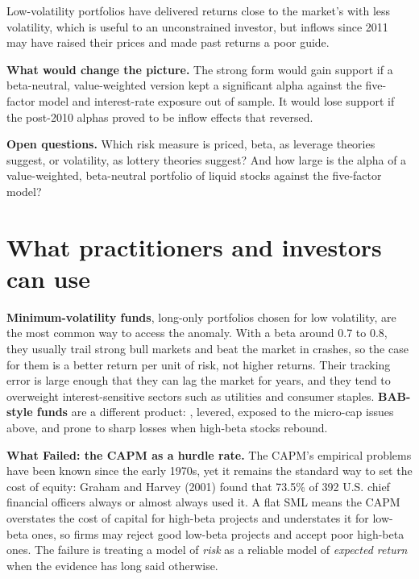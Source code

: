 Low-volatility portfolios have delivered returns close to the market's with less volatility, which is useful to an unconstrained investor, but inflows since 2011 may have raised their prices and made past returns a poor guide.

\textbf{What would change the picture.} The strong form would gain support if a beta-neutral, value-weighted version kept a significant alpha against the five-factor model and interest-rate exposure out of sample. It would lose support if the post-2010 alphas proved to be inflow effects that reversed.

\label{sec:18-open}
\textbf{Open questions.} Which risk measure is priced, beta, as leverage theories suggest, or volatility, as lottery theories suggest? And how large is the alpha of a value-weighted, beta-neutral portfolio of liquid stocks against the five-factor model?

\section{What practitioners and investors can use}
\label{sec:18-investors}

\textbf{Minimum-volatility funds}, long-only portfolios chosen for low volatility, are the most common way to access the anomaly. With a beta around 0.7 to 0.8, they usually trail strong bull markets and beat the market in crashes, so the case for them is a better return per unit of risk, not higher returns. Their tracking error is large enough that they can lag the market for years, and they tend to overweight interest-sensitive sectors such as utilities and consumer staples. \textbf{BAB-style funds} are a different product: , levered, exposed to the micro-cap issues above, and prone to sharp losses when high-beta stocks rebound.

\begin{callout}
\textbf{What Failed: the CAPM as a hurdle rate.} The CAPM's empirical problems have been known since the early 1970s, yet it remains the standard way to set the cost of equity: Graham and Harvey (2001) found that 73.5\% of 392 U.S. chief financial officers always or almost always used it. A flat SML means the CAPM overstates the cost of capital for high-beta projects and understates it for low-beta ones, so firms may reject good low-beta projects and accept poor high-beta ones. The failure is treating a model of \emph{risk} as a reliable model of \emph{expected return} when the evidence has long said otherwise.
\end{callout}
